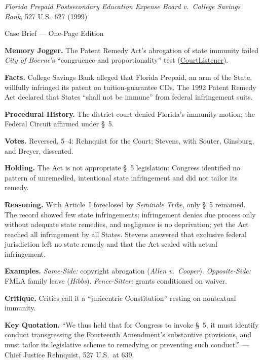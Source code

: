 \documentclass[12pt]{article}
\begin{document}
\begin{center}
{\Large \textit{Florida Prepaid Postsecondary Education Expense Board v.\ College Savings Bank}, 527 U.S.\ 627 (1999)\par}
\vspace{0.3em}
{\normalsize Case Brief --- One-Page Edition\par}
\end{center}

\textbf{Memory Jogger.} The Patent Remedy Act's abrogation of state immunity failed \textit{City of Boerne}'s ``congruence and proportionality'' test (\href{https://www.courtlistener.com/opinion/118316/florida-prepaid-postsecondary-education-expense-board-v-college-savings/}{CourtListener}).

\textbf{Facts.} College Savings Bank alleged that Florida Prepaid, an arm of the State, willfully infringed its patent on tuition-guarantee CDs. The 1992 Patent Remedy Act declared that States ``shall not be immune'' from federal infringement suits.

\textbf{Procedural History.} The district court denied Florida's immunity motion; the Federal Circuit affirmed under \S~5.

\textbf{Votes.} Reversed, 5--4: Rehnquist for the Court; Stevens, with Souter, Ginsburg, and Breyer, dissented.

\textbf{Holding.} The Act is not appropriate \S~5 legislation: Congress identified no pattern of unremedied, intentional state infringement and did not tailor its remedy.

\textbf{Reasoning.} With Article~I foreclosed by \textit{Seminole Tribe}, only \S~5 remained. The record showed few state infringements; infringement denies due process only without adequate state remedies, and negligence is no deprivation; yet the Act reached all infringement by all States. Stevens answered that exclusive federal jurisdiction left no state remedy and that the Act scaled with actual infringement.

\textbf{Examples.} \emph{Same-Side:} copyright abrogation (\textit{Allen v.\ Cooper}). \emph{Opposite-Side:} FMLA family leave (\textit{Hibbs}). \emph{Fence-Sitter:} grants conditioned on waiver.

\textbf{Critique.} Critics call it a ``juricentric Constitution'' resting on nontextual immunity.

\textbf{Key Quotation.} ``We thus held that for Congress to invoke \S~5, it must identify conduct transgressing the Fourteenth Amendment's substantive provisions, and must tailor its legislative scheme to remedying or preventing such conduct.'' --- Chief Justice Rehnquist, 527 U.S.\ at 639.
\end{document}
